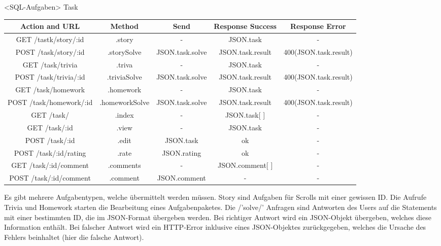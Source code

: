 \begin{interface}{40}{<SQL-Aufgaben>}
\newpage
Task
\begin{center}
	\smaller
	\begin{tabular}[h]{|c|c|c|c|c|}
	\hline
	\textbf{Action and URL} &\textbf {Method} &\textbf {Send} &\textbf {Response Success} & \textbf{Response Error}\\
	\hline
	GET     /tastk/story/:id & .story & -  & JSON.task  & - \\
	\hline
	POST     /task/story/:id & .storySolve & JSON.task.solve & JSON.task.result & 400(JSON.task.result) \\
	\hline
	GET     /task/trivia & .triva & - & JSON.task & - \\
	\hline
	POST     /task/trivia/:id & .triviaSolve & JSON.task.solve  & JSON.task.result & 400(JSON.task.result) \\
	\hline
	GET     /task/homework & .homework & - & JSON.task & - \\
	\hline
	POST     /task/homework/:id & .homeworkSolve & JSON.task.solve & JSON.task.result & 400(JSON.task.result) \\
	\hline
	GET     /task/ & .index & - & JSON.task[ ] & - \\
	\hline
	GET     /task/:id & .view & - & JSON.task & - \\
	\hline
	POST     /task/:id & .edit & JSON.task & ok & - \\
	\hline
	POST     /task/:id/rating & .rate & JSON.rating & ok & - \\
	\hline
	GET     /task/:id/comment & .comments & - & JSON.comment[ ] & - \\
	\hline
	POST     /task/:id/comment & .comment  & JSON.comment  & - & - \\
	\hline
	 \end{tabular}
\end{center}

\end{interface}

Es gibt mehrere Aufgabentypen, welche übermittelt werden müssen. Story sind Aufgaben für Scrolls mit einer gewissen ID. Die Aufrufe Trivia und Homework starten die Bearbeitung eines Aufgabenpaketes. Die /'solve/' Anfragen sind Antworten des Users auf die Statements mit einer bestimmten ID, die im JSON-Format übergeben werden. Bei richtiger Antwort wird ein JSON-Objekt übergeben, welches diese Information enthält. Bei falscher Antwort wird ein HTTP-Error inklusive eines JSON-Objektes zurückgegeben, welches die Ursache des Fehlers beinhaltet (hier die falsche Antwort). 

